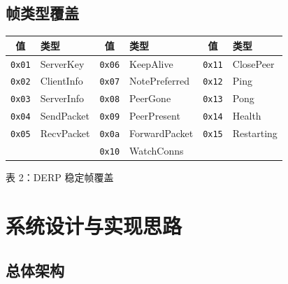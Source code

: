 \documentclass[UTF8,a4paper,zihao=-4]{ctexart}
\newcommand{\code}[1]{\texttt{\small #1}}
\begin{document}
\clearpage
\subsection{帧类型覆盖}

\centering
\small
\begin{tabular}{clclcl}
\toprule
\textbf{值} & \textbf{类型} & \textbf{值} & \textbf{类型} &
\textbf{值} & \textbf{类型} \\
\midrule
\code{0x01} & ServerKey      & \code{0x06} & KeepAlive     & \code{0x11} & ClosePeer \\
\code{0x02} & ClientInfo     & \code{0x07} & NotePreferred & \code{0x12} & Ping \\
\code{0x03} & ServerInfo     & \code{0x08} & PeerGone      & \code{0x13} & Pong \\
\code{0x04} & SendPacket     & \code{0x09} & PeerPresent   & \code{0x14} & Health \\
\code{0x05} & RecvPacket     & \code{0x0a} & ForwardPacket & \code{0x15} & Restarting \\
              &                & \code{0x10} & WatchConns     &              & \\
\bottomrule
\end{tabular}
\par\smallskip
表 2：DERP 稳定帧覆盖
\par
\normalsize
\raggedright

\section{系统设计与实现思路}

\subsection{总体架构}
\end{document}
